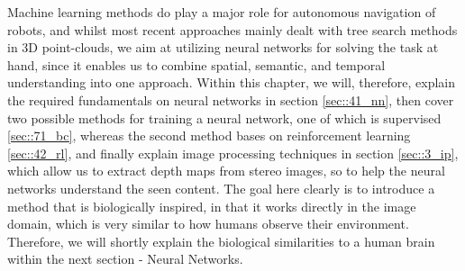 Machine learning methods do play a major role for autonomous navigation of robots, and whilst most recent approaches mainly dealt with tree search methods in 3D point-clouds, we aim at utilizing neural networks for solving the task at hand, since it enables us to combine spatial, semantic, and temporal understanding into one approach. Within this chapter, we will, therefore, explain the required fundamentals on neural networks in section \ref{sec::41_nn}, then cover two possible methods for training a neural network, one of which is supervised \ref{sec::71_bc}, whereas the second method bases on reinforcement learning \ref{sec::42_rl}, and finally explain image processing techniques in section \ref{sec::3_ip}, which allow us to extract depth maps from stereo images, so to help the neural networks understand the seen content. The goal here clearly is to introduce a method that is biologically inspired, in that it works directly in the image domain, which is very similar to how humans observe their environment. Therefore, we will shortly explain the biological similarities to a human brain within the next section - Neural Networks.
